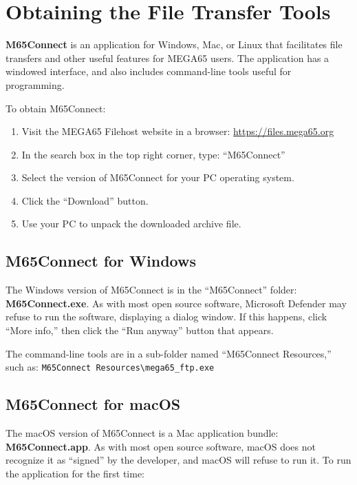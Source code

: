 \section{Obtaining the File Transfer Tools}

{\bf M65Connect} is an application for Windows, Mac, or Linux that facilitates file transfers and other useful features for MEGA65 users. The application has a windowed interface, and also includes command-line tools useful for programming.

To obtain M65Connect:

\begin{enumerate}
\item Visit the MEGA65 Filehost website in a browser: \url{https://files.mega65.org}
\item In the search box in the top right corner, type: ``M65Connect''
\item Select the version of M65Connect for your PC operating system.
\item Click the ``Download'' button.
\item Use your PC to unpack the downloaded archive file.
\end{enumerate}

\subsection{M65Connect for Windows}

The Windows version of M65Connect is in the ``M65Connect'' folder: {\bf M65Connect.exe}. As with most open source software, Microsoft Defender may refuse to run the software, displaying a dialog window. If this happens, click ``More info,'' then click the ``Run anyway'' button that appears.

The command-line tools are in a sub-folder named ``M65Connect Resources,'' such as: {\tt M65Connect Resources\textbackslash{}mega65\_ftp.exe}

\subsection{M65Connect for macOS}

The macOS version of M65Connect is a Mac application bundle: {\bf M65Connect.app}. As with most open source software, macOS does not recognize it as ``signed'' by the developer, and macOS will refuse to run it. To run the application for the first time:

